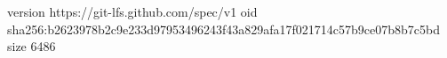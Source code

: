 version https://git-lfs.github.com/spec/v1
oid sha256:b2623978b2c9e233d97953496243f43a829afa17f021714c57b9ce07b8b7c5bd
size 6486
